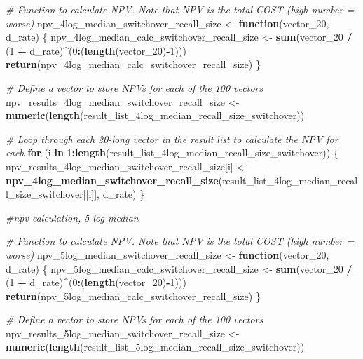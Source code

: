 \documentclass[
]{article}
\newenvironment{Shaded}{\begin{snugshade}}{\end{snugshade}}
\newcommand{\CommentTok}[1]{\textcolor[rgb]{0.56,0.35,0.01}{\textit{#1}}}
\newcommand{\ControlFlowTok}[1]{\textcolor[rgb]{0.13,0.29,0.53}{\textbf{#1}}}
\newcommand{\DecValTok}[1]{\textcolor[rgb]{0.00,0.00,0.81}{#1}}
\newcommand{\FunctionTok}[1]{\textcolor[rgb]{0.13,0.29,0.53}{\textbf{#1}}}
\newcommand{\NormalTok}[1]{#1}
\newcommand{\OtherTok}[1]{\textcolor[rgb]{0.56,0.35,0.01}{#1}}
\newcommand{\SpecialCharTok}[1]{\textcolor[rgb]{0.81,0.36,0.00}{\textbf{#1}}}
\begin{document}
\begin{Shaded}
\begin{Highlighting}[]
\CommentTok{\# Function to calculate NPV. Note that NPV is the total COST (high number = worse)}
\NormalTok{npv\_4log\_median\_switchover\_recall\_size }\OtherTok{\textless{}{-}} \ControlFlowTok{function}\NormalTok{(vector\_20, d\_rate) \{}
\NormalTok{  npv\_4log\_median\_calc\_switchover\_recall\_size }\OtherTok{\textless{}{-}} \FunctionTok{sum}\NormalTok{(vector\_20 }\SpecialCharTok{/}\NormalTok{ (}\DecValTok{1} \SpecialCharTok{+}\NormalTok{ d\_rate)}\SpecialCharTok{\^{}}\NormalTok{(}\DecValTok{0}\SpecialCharTok{:}\NormalTok{(}\FunctionTok{length}\NormalTok{(vector\_20)}\SpecialCharTok{{-}}\DecValTok{1}\NormalTok{)))}
  \FunctionTok{return}\NormalTok{(npv\_4log\_median\_calc\_switchover\_recall\_size)}
\NormalTok{\}}

\CommentTok{\# Define a vector to store NPVs for each of the 100 vectors}
\NormalTok{npv\_results\_4log\_median\_switchover\_recall\_size }\OtherTok{\textless{}{-}} \FunctionTok{numeric}\NormalTok{(}\FunctionTok{length}\NormalTok{(result\_list\_4log\_median\_recall\_size\_switchover))}

\CommentTok{\# Loop through each 20{-}long vector in the result list to calculate the NPV for each}
\ControlFlowTok{for}\NormalTok{ (i }\ControlFlowTok{in} \DecValTok{1}\SpecialCharTok{:}\FunctionTok{length}\NormalTok{(result\_list\_4log\_median\_recall\_size\_switchover)) \{}
\NormalTok{  npv\_results\_4log\_median\_switchover\_recall\_size[i] }\OtherTok{\textless{}{-}} \FunctionTok{npv\_4log\_median\_switchover\_recall\_size}\NormalTok{(result\_list\_4log\_median\_recall\_size\_switchover[[i]], d\_rate)}
\NormalTok{\}}




\CommentTok{\#npv calculation, 5 log median}


\CommentTok{\# Function to calculate NPV. Note that NPV is the total COST (high number = worse)}
\NormalTok{npv\_5log\_median\_switchover\_recall\_size }\OtherTok{\textless{}{-}} \ControlFlowTok{function}\NormalTok{(vector\_20, d\_rate) \{}
\NormalTok{  npv\_5log\_median\_calc\_switchover\_recall\_size }\OtherTok{\textless{}{-}} \FunctionTok{sum}\NormalTok{(vector\_20 }\SpecialCharTok{/}\NormalTok{ (}\DecValTok{1} \SpecialCharTok{+}\NormalTok{ d\_rate)}\SpecialCharTok{\^{}}\NormalTok{(}\DecValTok{0}\SpecialCharTok{:}\NormalTok{(}\FunctionTok{length}\NormalTok{(vector\_20)}\SpecialCharTok{{-}}\DecValTok{1}\NormalTok{)))}
  \FunctionTok{return}\NormalTok{(npv\_5log\_median\_calc\_switchover\_recall\_size)}
\NormalTok{\}}

\CommentTok{\# Define a vector to store NPVs for each of the 100 vectors}
\NormalTok{npv\_results\_5log\_median\_switchover\_recall\_size }\OtherTok{\textless{}{-}} \FunctionTok{numeric}\NormalTok{(}\FunctionTok{length}\NormalTok{(result\_list\_5log\_median\_recall\_size\_switchover))}


\end{Highlighting}
\end{Shaded}
\end{document}
